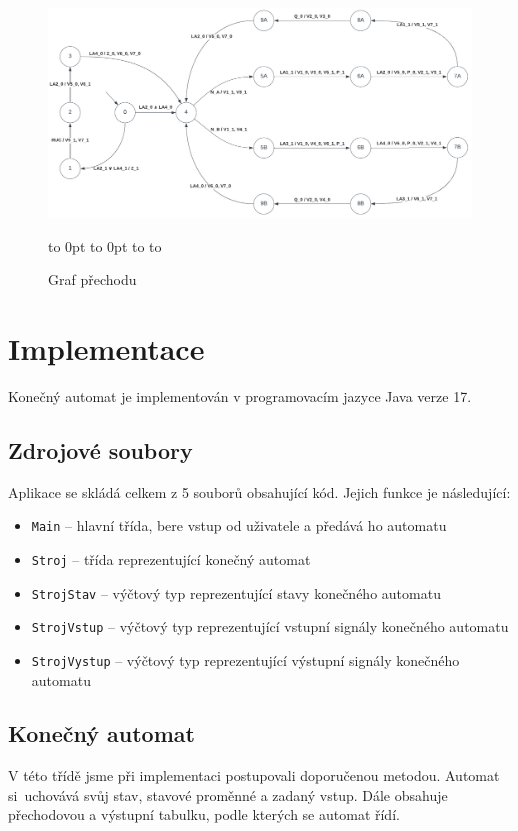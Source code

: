 \documentclass[12pt]{report}
\newcommand\horizontalpagenumber{
	\pagestyle{empty}
	\vbox to 0pt{\vss}\vfill
	\vbox to 0pt{\baselineskip0pt
	\hbox to\linewidth{\hss}
	\baselineskip\footskip
	\hbox to\linewidth{
	\hfil\thepage\hspace{30mm}}\vss}
}
\begin{document}
	\begin{landscape}
		\begin{figure}
			\centering
			\includegraphics[width=1.3\textwidth]{graf}
			\caption{Graf přechodu}
			\label{fig:graf}
			\horizontalpagenumber
			\end{figure}
	\end{landscape}
	\restoregeometry
	
	\chapter{Implementace}
	Konečný automat je implementován v programovacím jazyce Java verze 17.
	
	\section{Zdrojové soubory}
	Aplikace se skládá celkem z 5 souborů obsahující kód. Jejich funkce je následující:
	
	 \begin{itemize}
		\item \texttt{Main} – hlavní třída, bere vstup od uživatele a předává ho automatu
		\item \texttt{Stroj} – třída reprezentující konečný automat
		\item \texttt{StrojStav} – výčtový typ reprezentující stavy konečného automatu
		\item \texttt{StrojVstup} – výčtový typ reprezentující vstupní signály konečného automatu
		\item \texttt{StrojVystup} – výčtový typ reprezentující výstupní signály konečného automatu
	\end{itemize}	
	
	\section{Konečný automat}
	V této třídě jsme při implementaci postupovali doporučenou metodou. Automat si~uchovává svůj stav, stavové proměnné a zadaný vstup. Dále obsahuje přechodovou a výstupní tabulku, podle kterých se automat řídí.
	
\end{document}
